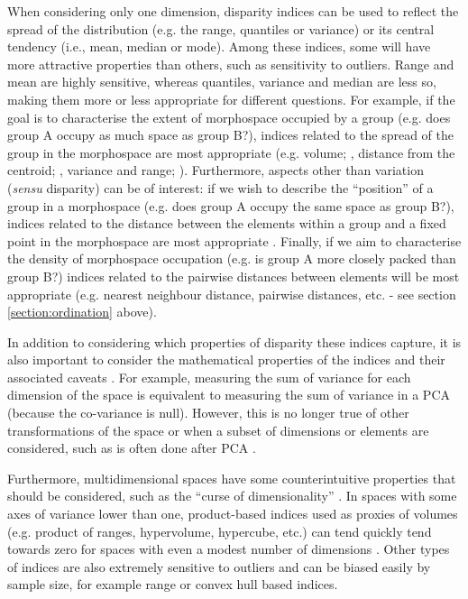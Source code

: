 \documentclass[12pt,letterpaper]{article}
\begin{document}
When considering only one dimension, disparity indices can be used to reflect the spread of the distribution (e.g.
the range, quantiles or variance) or its central tendency (i.e., mean, median or mode).
Among these indices, some will have more attractive properties than others, such as sensitivity to outliers.
Range and mean are highly sensitive, whereas quantiles, variance and median are less so, making them more or less appropriate for different questions.
For example, if the goal is to characterise the extent of morphospace occupied by a group (e.g. does group A occupy as much space as group B?), indices related to the spread of the group in the morphospace are most appropriate (e.g.
volume; \citealt{Diaz2016}, distance from the centroid; \citealt{Hopkins2017, Finlay2015}, variance and range; \citealt{Brusatte2008}).
Furthermore, aspects other than variation (\textit{sensu} disparity) can be of interest: if we wish to describe the ``position'' of a group in a morphospace (e.g.
does group A occupy the same space as group B?), indices related to the distance between the elements within a group and a fixed point in the morphospace are most appropriate \citep{GuillermeMOMS}.
Finally, if we aim to characterise the density of morphospace occupation (e.g.
is group A more closely packed than group B?) indices related to the pairwise distances between elements will be most appropriate (e.g. nearest neighbour distance, pairwise distances, etc. \citealt{Close2015} - see section \ref{section:ordination} above).

In addition to considering which properties of disparity these indices capture, it is also important to consider the mathematical properties of the indices and their associated caveats \citep{Wills2001, Ciampaglio2001}.
For example, measuring the sum of variance for each dimension of the space is equivalent to measuring the sum of variance in a PCA (because the co-variance is null).
However, this is no longer true of other transformations of the space or when a subset of dimensions or elements are considered, such as is often done after PCA \citep{Legendre2012}.

Furthermore, multidimensional spaces have some counterintuitive properties that should be considered, such as the ``curse of dimensionality'' \citep{Bellman1966}.
In spaces with some axes of variance lower than one, product-based indices used as proxies of volumes (e.g. product of ranges, hypervolume, hypercube, etc.) can tend quickly tend towards zero for spaces with even a modest number of dimensions \citep{Bellman1966}.
Other types of indices are also extremely sensitive to outliers and can be biased easily by sample size, for example range \citep{Wills2001} or convex hull based \citep{Jackson2011} indices.
\end{document}
